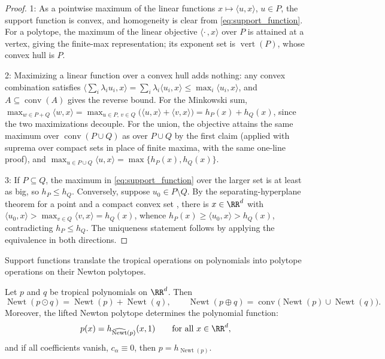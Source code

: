 \begin{proof}
1: As a pointwise maximum of the linear functions $x \mapsto \langle u, x\rangle$, $u \in P$, the support function is convex, and homogeneity is clear from \eqref{eq:support_function}. For a polytope, the maximum of the linear objective $\langle \cdot\,, x \rangle$ over $P$ is attained at a vertex, giving the finite-max representation; its exponent set is $\operatorname{vert}(P)$, whose convex hull is $P$.

2: Maximizing a linear function over a convex hull adds nothing: any convex combination satisfies $\bigl\langle \sum_i \lambda_i u_i, x \bigr\rangle = \sum_i \lambda_i \langle u_i, x\rangle \le \max_i \langle u_i, x \rangle$, and $A \subseteq \operatorname{conv}(A)$ gives the reverse bound. For the Minkowski sum, $\max_{w \in P + Q} \langle w, x \rangle = \max_{u \in P,\, v \in Q} \bigl( \langle u, x\rangle + \langle v, x\rangle \bigr) = h_P(x) + h_Q(x)$, since the two maximizations decouple. For the union, the objective attains the same maximum over $\operatorname{conv}(P \cup Q)$ as over $P \cup Q$ by the first claim (applied with suprema over compact sets in place of finite maxima, with the same one-line proof), and $\max_{u \in P \cup Q} \langle u, x \rangle = \max\{h_P(x), h_Q(x)\}$.

3: If $P \subseteq Q$, the maximum in \eqref{eq:support_function} over the larger set is at least as big, so $h_P \le h_Q$. Conversely, suppose $u_0 \in P \setminus Q$. By the separating-hyperplane theorem for a point and a compact convex set \cite{BoydVandenberghe2004}, there is $x \in \RR^d$ with $\langle u_0, x \rangle > \max_{v \in Q} \langle v, x \rangle = h_Q(x)$, whence $h_P(x) \ge \langle u_0, x\rangle > h_Q(x)$, contradicting $h_P \le h_Q$. The uniqueness statement follows by applying the equivalence in both directions.
\end{proof}

Support functions translate the tropical operations on polynomials into polytope operations on their Newton polytopes.

\begin{proposition}\label{prop:newton_calculus}
Let $p$ and $q$ be tropical polynomials on $\RR^d$. Then
\begin{equation}
	\operatorname{Newt}(p \odot q) = \operatorname{Newt}(p) + \operatorname{Newt}(q),
	\qquad
	\operatorname{Newt}(p \oplus q) = \operatorname{conv}\bigl( \operatorname{Newt}(p) \cup \operatorname{Newt}(q) \bigr).
	\label{eq:newton_calculus}
\end{equation}
Moreover, the lifted Newton polytope determines the polynomial function:
\begin{equation}
	p(x) = h_{\widehat{\operatorname{Newt}}(p)}(x, 1)
	\qquad \text{for all } x \in \RR^{d},
	\label{eq:lifted_support}
\end{equation}
and if all coefficients vanish, $c_{\alpha} \equiv 0$, then $p = h_{\operatorname{Newt}(p)}$.
\hfill{}
\end{proposition}

